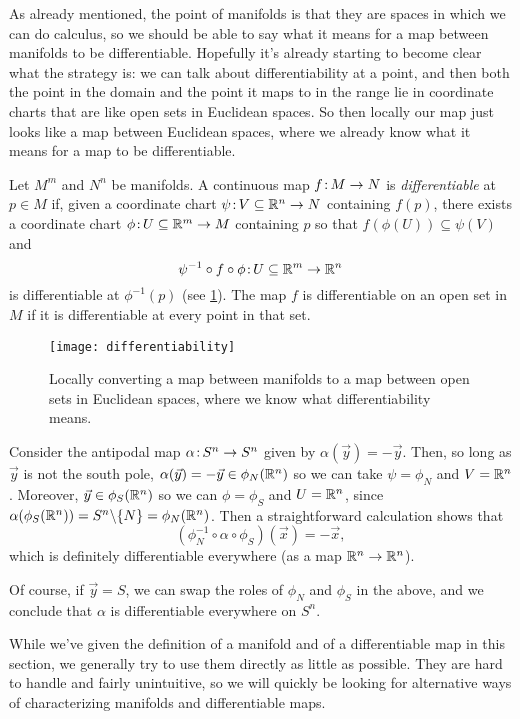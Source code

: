 As already mentioned, the point of manifolds is that they are spaces in which we can do calculus, so we should be able to say what it means for a map between manifolds to be differentiable. Hopefully it's already starting to become clear what the strategy is: we can talk about differentiability at a point, and then both the point in the domain and the point it maps to in the range lie in coordinate charts that are like open sets in Euclidean spaces. So then locally our map just looks like a map between Euclidean spaces, where we already know what it means for a map to be differentiable.

\begin{definition}\label{def:differentiable}
	Let $M^m$ and $N^n$ be manifolds. A continuous map $f\colon\thinspace\!\! M \to N$ is \emph{differentiable} at $p \in M$ if, given a coordinate chart $\psi\colon\thinspace\!\! V \subseteq \mathbb{R}^n \to N$ containing $f(p)$, there exists a coordinate chart $\phi\colon\thinspace\!\! U \subseteq \mathbb{R}^m \to M$ containing $p$ so that $f(\phi(U)) \subseteq \psi(V)$ and 
	\[
		\psi^{-1} \circ f \circ \phi\colon\thinspace\!\! U \subseteq \mathbb{R}^m \to \mathbb{R}^n
	\]
	is differentiable at $\phi^{-1}(p)$ (see \cref{fig:differentiable}). The map $f$ is differentiable on an open set in $M$ if it is differentiable at every point in that set.
\end{definition}

\begin{figure}[htbp]
	\centering
		\texttt{[image: differentiability]}
	\caption{Locally converting a map between manifolds to a map between open sets in Euclidean spaces, where we know what differentiability means.}
	\label{fig:differentiable}
\end{figure}

\begin{example}
	Consider the antipodal map $\alpha \colon\thinspace\!\! S^n \to S^n$ given by $\alpha(\vec{y}) = -\vec{y}$. Then, so long as $\vec{y}$ is not the south pole, $\alpha(\vec{y}) = -\vec{y} \in \phi_N(\mathbb{R}^n)$ so we can take $\psi = \phi_N$ and $V = \mathbb{R}^n$. Moreover, $\vec{y} \in \phi_S(\mathbb{R}^n)$ so we can $\phi = \phi_S$ and $U = \mathbb{R}^n$, since $\alpha(\phi_S(\mathbb{R}^n)) = S^n \backslash\{N\} = \phi_N(\mathbb{R}^n)$. Then a straightforward calculation shows that
	\[
		(\phi_N^{-1} \circ \alpha \circ \phi_S)(\vec{x}) = -\vec{x},
	\]
	which is definitely differentiable everywhere (as a map $\mathbb{R}^n \to \mathbb{R}^n$). 
	
	Of course, if $\vec{y} = S$, we can swap the roles of $\phi_N$ and $\phi_S$ in the above, and we conclude that $\alpha$ is differentiable everywhere on $S^n$.
\end{example}

While we've given the definition of a manifold and of a differentiable map in this section, we generally try to use them directly as little as possible. They are hard to handle and fairly unintuitive, so we will quickly be looking for alternative ways of characterizing manifolds and differentiable maps.
